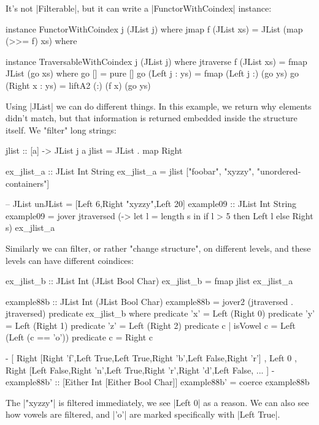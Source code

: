 It's not |Filterable|, but it can write a |FunctorWithCoindex| instance:

\begin{code}
instance FunctorWithCoindex j (JList j) where
    jmap f (JList xs) = JList (map (>>= f) xs) where

instance TraversableWithCoindex j (JList j) where
    jtraverse f (JList xs) = fmap JList (go xs) where
        go []             = pure []
        go (Left j : ys)  = fmap (Left j :) (go ys)
        go (Right x : ys) = liftA2 (:) (f x) (go ys)
\end{code}

Using |JList| we can do different things.
In this example, we return why elements didn't match,
but that information is returned embedded inside the structure itself.
We "filter" long strings:

\begin{code}
jlist :: [a] -> JList j a
jlist = JList . map Right

ex_jlist_a :: JList Int String
ex_jlist_a = jlist ["foobar", "xyzzy", "unordered-containers"]

-- JList {unJList = [Left 6,Right "xyzzy",Left 20]}
example09 :: JList Int String
example09 = jover jtraversed
    (\s -> let l = length s in if l > 5 then Left l else Right s)
    ex_jlist_a
\end{code}

Similarly we can filter, or rather "change structure", on different levels,
and these levels can have different coindices:

\begin{code}
ex_jlist_b :: JList Int (JList Bool Char)
ex_jlist_b = fmap jlist ex_jlist_a

example88b :: JList Int (JList Bool Char)
example88b = jover2
    (jtraversed . jtraversed)
    predicate
    ex_jlist_b
  where
    predicate 'x'           = Left (Right 0)
    predicate 'y'           = Left (Right 1)
    predicate 'z'           = Left (Right 2)
    predicate c | isVowel c = Left (Left (c == 'o'))
    predicate c             = Right c

{-
[ Right [Right 'f',Left True,Left True,Right 'b',Left False,Right 'r']
, Left 0
, Right [Left False,Right 'n',Left True,Right 'r',Right 'd',Left False, ...
]
-}
example88b' :: [Either Int [Either Bool Char]]
example88b' = coerce example88b
\end{code}

The |"xyzzy"| is filtered immediately, we see |Left 0| as a reason.
We can also see how vowels are filtered, and |'o'| are marked specifically
with |Left True|.

